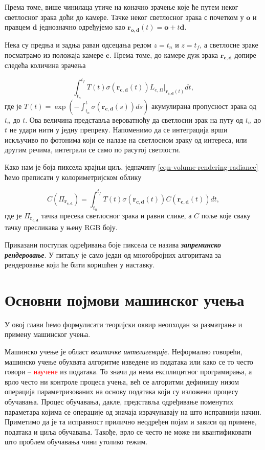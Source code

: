 \documentclass[12pt, a4paper, twoside]{book}
\numberwithin{equation}{chapter}
\numberwithin{theorem}{section}
\numberwithin{definition}{section}
\numberwithin{definitionChapter}{chapter}
\begin{document}
Према томе, више чинилаца утиче на коначно зрачење које ће путем неког светлосног зрака доћи до камере.
Тачке неког светлосног зрака с почетком у $\mathbf{o}$ и правцем $\mathbf{d}$ једнозначно одређујемо
као $\mathbf{r_{o, d}}(t) = \mathbf{o} + t\mathbf{d}$.

Нека су предња и задња раван одсецања редом $z=t_n$ и $z=t_f$, а светлосне зраке посматрамо из положаја
камере $\mathbf{c}$. Према томе, до камере дуж зрака $\mathbf{r_{c, d}}$ допире следећа
количина зрачења

\begin{equation}
	\int_{t_n}^{t_f}T(t)\sigma(\mathbf{r_{c, d}}(t))L_{e, \Omega}\bigr|_{\mathbf{r_{c, d}}(t)}dt,
	\label{eqn-volume-rendering-radiance}
\end{equation}
где је $T(t)=\exp{\left(-\int_{t_n}^{t}\sigma(\mathbf{r_{c, d}}(s))ds\right)}$ акумулирана пропусност
зрака од $t_n$ до $t$. Ова величина представља вероватноћу да светлосни зрак на путу од $t_n$ до
$t$ не удари нити у једну препреку. Напоменимо да се интеграција врши искључиво по фотонима
који се налазе на светлосном зраку од интереса, или другим речима, интеграли се само по
расутој светлости.

Како нам је боја пиксела крајњи циљ, једначину \ref{eqn-volume-rendering-radiance} ћемо
преписати у колориметријском облику

\begin{equation}
	C(\Pi_{\mathbf{r_{c, d}}}) = \int_{t_n}^{t_f}T(t)\sigma(\mathbf{r_{c, d}}(t))C(\mathbf{r_{c, d}}(t))dt,
	\label{eqn-volume-rendering-colorimetry}
\end{equation}
где jе $\Pi_{\mathbf{r_{c, d}}}$ тачка пресека светлосног зрака и равни слике, а $C$ поље које сваку тачку
пресликава у њену RGB боју.

Приказани поступак одређивања боје пиксела се назива \textbf{\textit{запреминско рендеровање}}.
У питању је само један од многобројних алгоритама за рендеровање који ће бити коришћен у наставку.

\chapter{Основни појмови машинског учења}
У овој глави ћемо формулисати теоријски оквир неопходан за разматрање и примену машинског учења.

Машинско учење је област \textit{вештачке интелигенције}. Неформално говорећи, машинско учење
обухвата алгоритме изведене из података или како се то често говори -- \textcolor{red}{научене} из података.
То значи да нема експлицитног програмирања, а врло често ни контроле процеса учења, већ се
алгоритми дефинишу низом операција параметризованих на основу података који су изложени
процесу обучавања. Процес обучавања, дакле, представља одређивање поменутих параметара
којима се операције од значаја израчунавају на што исправнији начин. Приметимо да је та
исправност прилично неодређен појам и зависи од примене, података и циља обучавања. Такође,
врло се често не може ни квантификовати што проблем обучавања чини утолико тежим.
\end{document}
